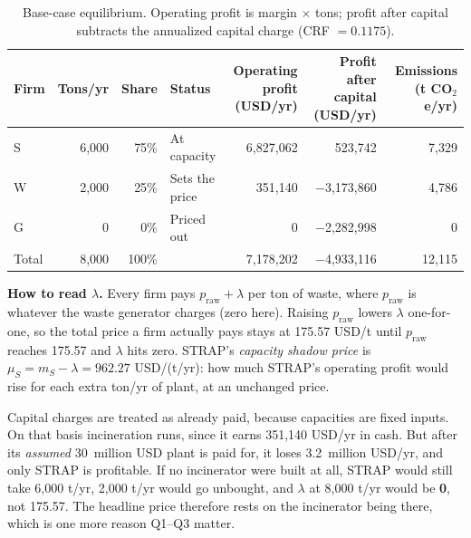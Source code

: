 \documentclass[11pt]{article}
\newcommand{\usd}{USD}
\begin{document}
\begin{table}[h]
\centering
\caption{Base-case equilibrium. Operating profit is margin $\times$ tons; profit
after capital subtracts the annualized capital charge (CRF $=0.1175$).}
\label{tab:base}
\begin{tabular}{@{}lrrlrrr@{}}
\toprule
Firm & Tons/yr & Share & Status & \shortstack{Operating\\profit (\usd/yr)} & \shortstack{Profit after\\capital (\usd/yr)} & \shortstack{Emissions\\(t CO$_2$e/yr)} \\
\midrule
S & 6{,}000 & 75\% & At capacity     & 6{,}827{,}062 &    523{,}742 & 7{,}329 \\
W & 2{,}000 & 25\% & Sets the price  &   351{,}140 & $-$3{,}173{,}860 & 4{,}786 \\
G &       0 &  0\% & Priced out      &         0   & $-$2{,}282{,}998 &       0 \\
\midrule
Total & 8{,}000 & 100\% & & 7{,}178{,}202 & $-$4{,}933{,}116 & 12{,}115 \\
\bottomrule
\end{tabular}
\end{table}

\textbf{How to read $\lambda$.} Every firm pays $p_{\mathrm{raw}}+\lambda$ per
ton of waste, where $p_{\mathrm{raw}}$ is whatever the waste generator charges
(zero here). Raising $p_{\mathrm{raw}}$ lowers $\lambda$ one-for-one, so the
total price a firm actually pays stays at 175.57 \usd/t until $p_{\mathrm{raw}}$
reaches 175.57 and $\lambda$ hits zero. STRAP's \emph{capacity shadow price} is
$\mu_S = m_S-\lambda = 962.27$ \usd/(t/yr): how much STRAP's operating profit
would rise for each extra ton/yr of plant, at an unchanged price.

\begin{cautionbox}[title={Worth knowing: the price depends on incineration existing}]
Capital charges are treated as already paid, because capacities are fixed inputs.
On that basis incineration runs, since it earns 351{,}140 \usd/yr in cash. But
after its \emph{assumed} 30~million \usd{} plant is paid for, it loses 3.2~million \usd/yr, and
only STRAP is profitable. If no incinerator were built at all, STRAP would
still take 6{,}000 t/yr, 2{,}000 t/yr would go unbought, and
$\lambda$ at 8{,}000 t/yr would be \textbf{0}, not 175.57. The headline price
therefore rests on the incinerator being there, which is one more reason
Q1--Q3 matter.
\end{cautionbox}
\end{document}
